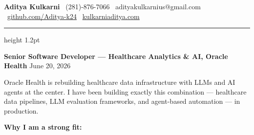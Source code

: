 \documentclass[11pt,letterpaper]{article}
\begin{document}
\thispagestyle{empty}

{\large \textbf{Aditya Kulkarni}} \hfill
{\color{OracleRed} \faPhone\ (281)-876-7066} \quad
{\color{OracleRed} \faEnvelope\ adityakulkarnius@gmail.com} \\
{\color{OracleRed} \faGithub\ \href{https://github.com/Aditya-k24}{github.com/Aditya-k24}} \quad
{\color{OracleRed} \faGlobe\ \href{https://www.kulkarniaditya.com}{kulkarniaditya.com}}

\vspace{6pt}
{\color{OracleRed}\hrule height 1.2pt}
\vspace{12pt}

{\color{OracleRed} \textbf{Senior Software Developer --- Healthcare Analytics \& AI, Oracle Health}} \hfill June 20, 2026

\vspace{10pt}

Oracle Health is rebuilding healthcare data infrastructure with LLMs and AI agents at the center. I have been building exactly this combination --- healthcare data pipelines, LLM evaluation frameworks, and agent-based automation --- in production.

\vspace{6pt}

\textbf{Why I am a strong fit:}
\end{document}
